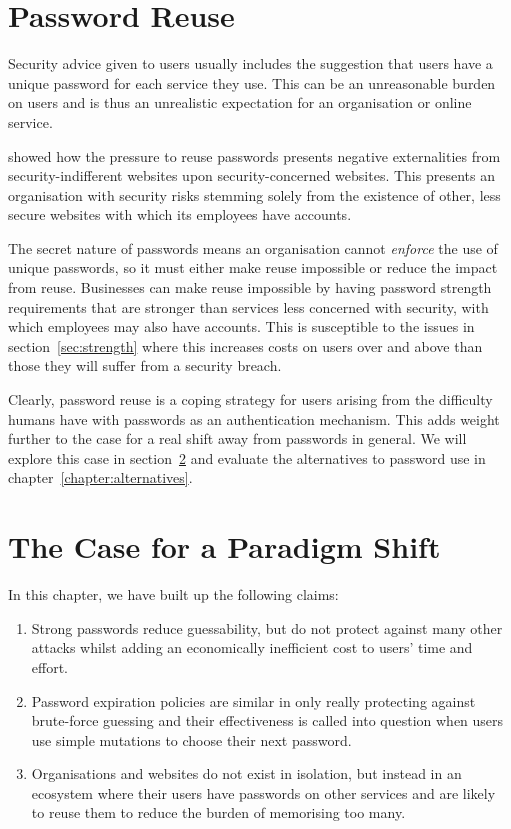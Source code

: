 \documentclass{report}
\begin{document}
\section{Password Reuse}

Security advice given to users usually includes the suggestion that users
have a unique password for each service they use. This can
be an unreasonable burden on users\parencite{florencio2014password}
and is thus an unrealistic expectation for an organisation or online
service.

\textcite{preibusch2010password} showed how the pressure to reuse passwords
presents negative externalities from security-indifferent websites upon
security-concerned websites. This presents an organisation with
security risks stemming solely from the existence of other, less
secure websites with which its employees have accounts.

The secret nature of passwords means an organisation cannot \emph{enforce}
the use of unique passwords, so it must either make reuse impossible or
reduce the impact from reuse. Businesses can make reuse impossible
by having password strength requirements that are stronger than
services less concerned with security, with which employees may also have
accounts. This is susceptible to the issues in section~\ref{sec:strength}
where this increases costs on users over and above than those they will
suffer from a security breach.

Clearly, password reuse is a coping strategy for users arising from the
difficulty humans have with passwords as an authentication mechanism. This
adds weight further to the case for a real shift away from passwords in
general. We will explore this case in section~\ref{sec:case} and evaluate
the alternatives to password use in chapter~\ref{chapter:alternatives}.

\section{The Case for a Paradigm Shift}
\label{sec:case}

In this chapter, we have built up the following claims:

\begin{enumerate}
  \item Strong passwords reduce guessability, but do not protect against
    many other attacks whilst adding an economically inefficient cost to users'
    time and effort.
  \item Password expiration policies are similar in only really protecting against
    brute-force guessing and their effectiveness is called into question when
    users use simple mutations to choose their next password.
  \item Organisations and websites do not exist in isolation, but instead in
    an ecosystem where their users have passwords on other services and are likely
    to reuse them to reduce the burden of memorising too many.
\end{enumerate}
\end{document}
